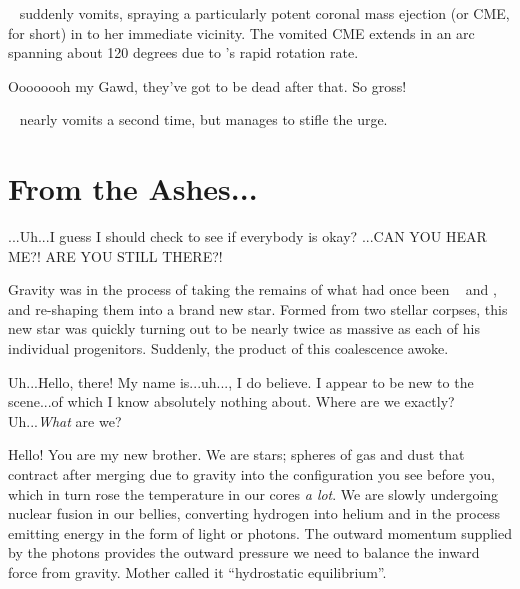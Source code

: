 \documentclass[main.tex]{subfiles}
\begin{document}
\par \nar \rmcelaeno~ suddenly vomits, spraying a particularly potent coronal mass ejection (or CME, for short) in to her immediate vicinity.  The vomited CME extends in an arc spanning about 120 degrees due to \rmcelaeno's rapid rotation rate.

\par \Celaeno Oooooooh my Gawd, they've got to be dead after that.  So gross!  

\par \nar \rmcelaeno~ nearly vomits a second time, but manages to stifle the urge.

\section{From the Ashes...} 

\par \Celaeno ...Uh...I guess I should check to see if everybody is okay? ...CAN YOU HEAR ME?!  ARE YOU STILL THERE?! 

\par \nar Gravity was in the process of taking the remains of what had once been \rmtaygete~ and \rmalcyone, and re-shaping them into a brand new star.  Formed from two stellar corpses, this new star was quickly turning out to be nearly twice as massive as each of his individual progenitors.  Suddenly, the product of this coalescence awoke.


\par \Lacedaemon Uh...Hello, there!  My name is...uh...\rmlacedaemon, I do believe.  I appear to be new to the scene...of which I know absolutely nothing about.  Where are we exactly?  Uh...\textit{What} are we?

\par \Celaeno Hello!  You are my new brother.  We are stars; spheres of gas and dust that contract after merging due to gravity into the configuration you see before you, which in turn rose the temperature in our cores \textit{a lot}.  We are slowly undergoing nuclear fusion in our bellies, converting hydrogen into helium and in the process emitting energy in the form of light or photons.  The outward momentum supplied by the photons provides the outward pressure we need to balance the inward force from gravity.  Mother called it ``hydrostatic equilibrium''.
\end{document}
